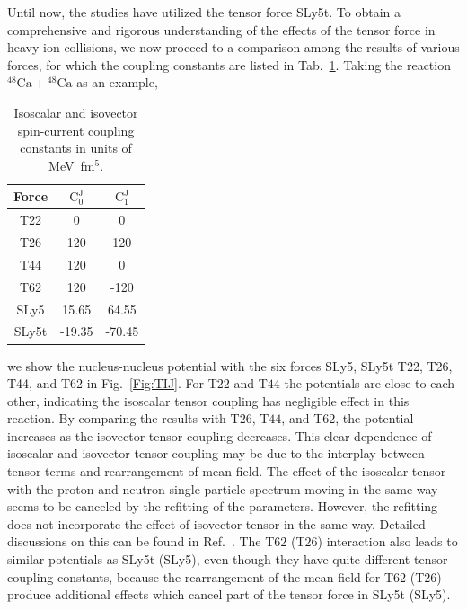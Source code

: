 Until now, the studies have utilized the tensor force SLy5t.
To obtain a comprehensive and rigorous understanding of the effects of the tensor force in heavy-ion collisions,
we now proceed to a comparison among the results of various forces, for which the coupling constants
are listed in Tab.~\ref{tab:CC}. Taking the reaction $^{48}\mathrm{Ca}+\mathrm{^{48}Ca}$ as an example,
\begin{table}[!hbt]
	\caption{Isoscalar and isovector spin-current coupling constants in units of MeV~fm$^5$.}
	\label{tab:CC}
		\begin{tabular}{c c c}
			Force & $\mathrm{C}^\mathrm{J}_0$ & $\mathrm{C}^\mathrm{J}_1$  \\
			\hline
			T22   &     0   &      0   \\
			T26   &   120   &    120   \\
			T44   &   120   &      0   \\
			T62   &   120   &   -120   \\
			SLy5  &  15.65  &    64.55  \\
			SLy5t & -19.35  &   -70.45
		\end{tabular}
\end{table}
we show the nucleus-nucleus potential with the six forces SLy5, SLy5t T22, T26, T44, and T62 in Fig.~\ref{Fig:TIJ}.
For T$22$ and T$44$ the potentials are close to each other, indicating the isoscalar tensor coupling has
negligible effect in this reaction. By comparing the results with T$26$, T$44$, and T$62$, the potential increases as the isovector tensor
coupling decreases. This clear dependence of isoscalar and isovector tensor coupling may be due to the interplay between tensor terms
and rearrangement of mean-field. The effect of the isoscalar tensor with the proton and neutron single particle spectrum moving
in the same way seems to be canceled by the refitting of the parameters.
However, the refitting does not incorporate the effect of isovector tensor in the same way.
Detailed discussions on this can be found in Ref.~\citep{Guo2018_PLB782-401}.
The T$62$ (T$26$) interaction also leads to similar potentials as SLy5t (SLy5), even though they have quite different tensor coupling constants,
because the rearrangement of the mean-field for T$62$ (T$26$)
produce additional effects which cancel part of the tensor force in SLy5t (SLy5).
